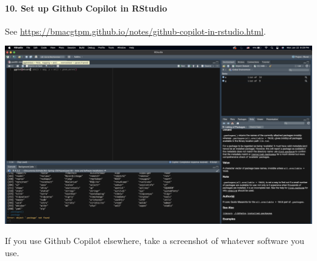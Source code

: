 \documentclass[
]{article}
\begin{document}
\hypertarget{set-up-github-copilot-in-rstudio}{%
\paragraph{10. Set up Github Copilot in
RStudio}\label{set-up-github-copilot-in-rstudio}}

See
\url{https://bmacgtpm.github.io/notes/github-copilot-in-rstudio.html}.

\includegraphics{img/snip of Github copilot.png}

If you use Github Copilot elsewhere, take a screenshot of whatever
software you use.
\end{document}

